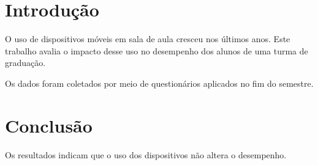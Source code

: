\documentclass[11pt, a4paper]{article}
\begin{document}
\section{Introdução}

O uso de dispositivos móveis em sala de aula cresceu nos últimos anos. Este trabalho avalia o
impacto desse uso no desempenho dos alunos de uma turma de graduação.

Os dados foram coletados por meio de questionários aplicados no fim do semestre.

\section{Conclusão}

Os resultados indicam que o uso dos dispositivos não altera o desempenho.
\end{document}
